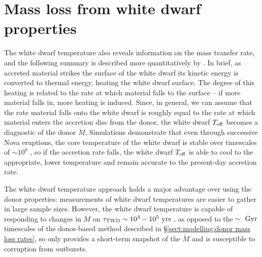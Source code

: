 \section{Mass loss from white dwarf properties}
\label{sect:modelling:white dwarf mass loss rates}



The white dwarf temperature also reveals information on the mass transfer rate, and the following summary is described more quantitatively by \citet{townsley2009}.
In brief, as accreted material strikes the surface of the white dwarf its kinetic energy is converted to thermal energy, heating the white dwarf surface.
The degree of this heating is related to the rate at which material falls to the surface -- if more material falls in, more heating is induced.
Since, in general, we can assume that the rate material falls onto the white dwarf is roughly equal to the rate at which material enters the accretion disc from the donor, the white dwarf $T_{\rm eff}$ becomes a diagnostic of the donor $\dot M$.
Simulations demonstrate that even through successive Nova eruptions, the core temperature of the white dwarf is stable over timescales of $\sim 10^8$ \citep{epelstain2007}, so if the accretion rate falls, the white dwarf $T_{\rm eff}$ is able to cool to the appropriate, lower temperature and remain accurate to the present-day accretion rate.

The white dwarf temperature approach holds a major advantage over using the donor properties: measurements of white dwarf temperatures are easier to gather in large sample sizes.
However, the white dwarf temperature is capable of responding to changes in $\dot M$ on $\tau_{\rm TWD} \sim 10^3 - 10^5\ {\rm yrs}$ \citep{townsley2009}, as opposed to the $\rm \sim~Gyr$ timescales of the donor-based method described in \S\ref{sect:modelling:donor mass loss rates}, so only provides a short-term snapshot of the $\dot M$ and is susceptible to corruption from outbursts.

